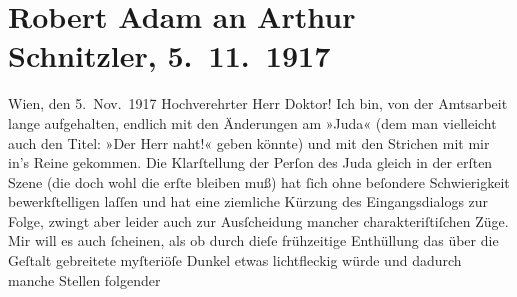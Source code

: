 

         
         \newcommand{\erwaehntePersonen}{Personen: Titus Livius}
         \newcommand{\erwaehnteOrte}{Orte: Griechenland, Ostia Antica, Rom, Wien}
         \newcommand{\erwaehnteWerke}{Werke: Das Ende des Judas}
               \section[Robert Adam an Arthur Schnitzler, 5. 11. 1917]{ Robert Adam an Arthur Schnitzler, 5. 11. 1917}\nopagebreak{}\rehead{ }\begin{ledgroupsized}[t]{13cm}\normalsize\beginnumbering \toendnotes[C]{\smallbreak\pagebreak[2]} 
\pstart
           \raggedleft{}{\pb}Wien, den 5. Nov. 1917\pend
           \pstart\center{}Hochverehrter Herr Doktor!\pend\pstart
           Ich bin, von der Amtsarbeit lange aufgehalten, endlich mit den Änderungen am »Juda« (dem man vielleicht auch den Titel: »Der
                    Herr naht!« geben könnte) und mit den Strichen mit mir in’s Reine gekommen. Die
                    Klarſtellung der Perſon des Juda gleich in der erſten Szene (die doch wohl die
                    erſte bleiben muß) hat ſich ohne beſondere Schwierigkeit bewerkſtelligen laſſen
                    und hat eine ziemliche Kürzung des Eingangsdialogs zur Folge, zwingt aber leider
                    auch zur Ausſcheidung mancher charakteriſtiſchen Züge. Mir will es auch
                    ſcheinen,  als ob durch dieſe frühzeitige
                    Enthüllung das über die Geſtalt gebreitete myſteriöſe Dunkel etwas lichtfleckig
                    würde und  dadurch manche Stellen folgender

\end{ledgroupsized}
